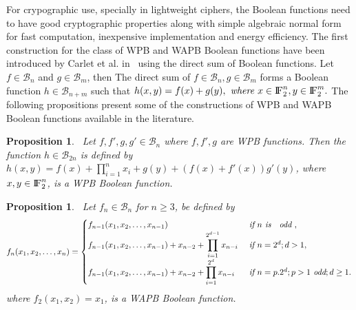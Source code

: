 \documentclass{article}[12pt]
\newtheorem{proposition}[theorem]{Proposition}
\newcommand{\FF}{{\rm I\!F}}
\newcommand{\CB}{\mathcal{B}}
\begin{document}
For crypographic use, specially in lightweight ciphers, the Boolean functions need to have good cryptographic properties along with simple algebraic normal form for fast computation, inexpensive implementation and energy efficiency.
The first construction for the class of WPB and WAPB Boolean functions have been introduced by Carlet et al. in~\cite{CMR17} using the direct sum of Boolean functions. Let $f \in \CB_n$ and $g \in\CB_m$, then The direct sum of $f \in \CB_n, g \in \CB_m$ forms a Boolean function $h \in\CB_{n+m}$ such that $h(x,y)= f(x) + g(y) , \textit{ where  } x \in \FF_2^n , y \in \FF_2^m.$ The following propositions present some of the constructions of WPB and WAPB Boolean functions available in the literature.
\begin{proposition}~\cite{CMR17}\label{cons:CMR1}
Let $f, f', g, g' \in \CB_n$ where $f, f', g$ are WPB functions. Then the function $h \in \CB_{2n}$ is defined by $\displaystyle{h(x,y)= f(x) + \prod_{i=1}^n x_i + g(y) + (f(x) + f'(x)) g'(y)}$,  where $x,y \in \FF_2^n$, is a WPB Boolean function.
\end{proposition}

\begin{proposition}~\cite{CMR17}\label{cons:CMR2}
    Let $f_n \in \CB_n$ for $n \geq 3$, be defined by 
    \begin{equation*}
        f_n(x_1,x_2,\ldots,x_n)= 
        \begin{cases}
            f_{n-1}(x_1,x_2,\ldots,x_{n-1}) & \textit{ if } n \textit{ is \; odd },\\
            \displaystyle{f_{n-1}(x_1,x_2,\ldots,x_{n-1})+ x_{n-2} + \prod_{i=1}^{2^{d-1}}x_{n-i}} & \textit{ if } n=2^{d}; d >1 , \\
            \displaystyle{f_{n-1}(x_1,x_2,\ldots,x_{n-1})+ x_{n-2} + \prod_{i=1}^{2^{d}}x_{n-i}} & \textit{ if } n= p.2^{d}; p >1 \textit{ odd}; d \geq 1. 
        \end{cases}
    \end{equation*}
    where $f_2(x_1,x_2)=x_1$, is a WAPB Boolean function.
\end{proposition}
\end{document}
